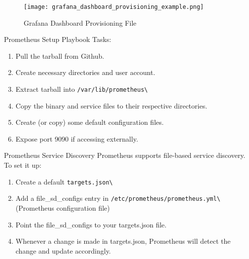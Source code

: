 \documentclass[14pt,compress,usenames,dvipsnames,aspectratio=169]{beamer}
\begin{document}
\begin{figure}
    \centering
    \texttt{[image: grafana\_dashboard\_provisioning\_example.png]}
    \caption{Grafana Dashboard Provisioning File}
    \label{fig:enter-label}
\end{figure}

\begin{frame}{Prometheus Setup Playbook}
    Tasks:
    \begin{enumerate}
        \item{Pull the tarball from Github.} 
        \item{Create necessary directories and user account.} 
        \item{Extract tarball into \verb+/var/lib/prometheus\+} 
        \item{Copy the binary and service files to their respective directories.} 
        \item{Create (or copy) some default configuration files.} 
        \item{Expose port 9090 if accessing externally.} 
    \end{enumerate}
\end{frame}

\begin{frame}{Prometheus Service Discovery}
    Prometheus supports file-based service discovery.  
    To set it up:
    \begin{enumerate}
        \item{Create a default \verb+targets.json\+} 
        \item{Add a file\_sd\_configs entry in \verb+/etc/prometheus/prometheus.yml\+
            (Prometheus configuration file)} 
        \item{Point the file\_sd\_configs to your targets.json file.} 
        \item{Whenever a change is made in targets.json, Prometheus will detect the
            change and update accordingly.}
    \end{enumerate}
\end{frame}
\end{document}
